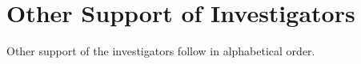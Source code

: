 
\chapter{Other Support of Investigators}
\label{sec:other-support}

\noindent
Other support of the investigators follow in alphabetical
order.  

\minitoc

\newpage

\newpage
{}
\newpage
{}
\newpage
